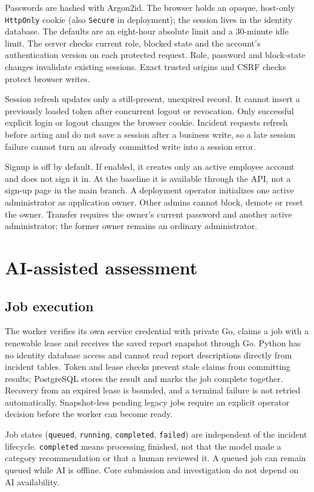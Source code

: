 \documentclass[11pt,a4paper]{article}
\newcommand{\code}[1]{\texttt{#1}}
\begin{document}
Passwords are hashed with Argon2id. The browser holds an opaque, host-only
\code{HttpOnly} cookie (also \code{Secure} in deployment); the session lives
in the identity database. The defaults are an eight-hour absolute limit and
a 30-minute idle limit. The server checks current role, blocked state and
the account's authentication version on each protected request. Role,
password and block-state changes invalidate existing sessions. Exact trusted
origins and CSRF checks protect browser writes.

Session refresh updates only a still-present, unexpired record. It cannot
insert a previously loaded token after concurrent logout or revocation.
Only successful explicit login or logout changes the browser cookie.
Incident requests refresh before acting and do not save a session after a
business write, so a late session failure cannot turn an already committed
write into a session error.

Signup is off by default. If enabled, it creates only an active employee
account and does not sign it in. At the baseline it is available through the
API, not a sign-up page in the main branch. A deployment operator initializes
one active administrator as application owner. Other admins cannot block,
demote or reset the owner. Transfer requires the owner's current password
and another active administrator; the former owner remains an ordinary
administrator.

\section{AI-assisted assessment}

\subsection{Job execution}

The worker verifies its own service credential with private Go, claims a job
with a renewable lease and receives the saved report snapshot through Go.
Python has no identity database access and cannot read report descriptions
directly from incident tables. Token and lease checks prevent stale claims
from committing results; PostgreSQL stores the result and marks the job
complete together. Recovery from an expired lease is bounded, and a terminal
failure is not retried automatically. Snapshot-less pending legacy jobs
require an explicit operator decision before the worker can become ready.

Job states (\code{queued}, \code{running}, \code{completed}, \code{failed})
are independent of the incident lifecycle. \code{completed} means processing
finished, not that the model made a category recommendation or that a
human reviewed it. A queued job can remain queued while AI is offline.
Core submission and investigation do not depend on AI availability.
\end{document}
